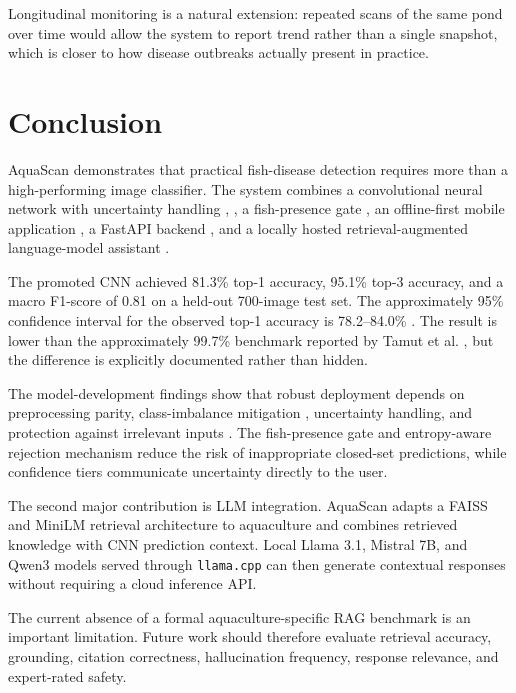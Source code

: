 \documentclass[conference]{IEEEtran}
\begin{document}
Longitudinal monitoring is a natural extension: repeated scans of the same pond over time would allow the system to report trend rather than a single snapshot, which is closer to how disease outbreaks actually present in practice.



\section{Conclusion}

AquaScan demonstrates that practical fish-disease detection requires more than a high-performing image classifier. The system combines a convolutional neural network with uncertainty handling \cite{b24}, \cite{b25}, a fish-presence gate \cite{b7}, an offline-first mobile application \cite{b14}, a FastAPI backend \cite{b15}, and a locally hosted retrieval-augmented language-model assistant \cite{b4}.

The promoted CNN achieved 81.3\% top-1 accuracy, 95.1\% top-3 accuracy, and a macro F1-score of 0.81 on a held-out 700-image test set. The approximately 95\% confidence interval for the observed top-1 accuracy is 78.2--84.0\% \cite{b17}. The result is lower than the approximately 99.7\% benchmark reported by Tamut et al. \cite{b1}, but the difference is explicitly documented rather than hidden.

The model-development findings show that robust deployment depends on preprocessing parity, class-imbalance mitigation \cite{b3}, uncertainty handling, and protection against irrelevant inputs \cite{b25}. The fish-presence gate and entropy-aware rejection mechanism \cite{b24} reduce the risk of inappropriate closed-set predictions, while confidence tiers communicate uncertainty directly to the user.

The second major contribution is LLM integration. AquaScan adapts a FAISS \cite{b6} and MiniLM \cite{b5} retrieval architecture to aquaculture and combines retrieved knowledge with CNN prediction context. Local Llama 3.1, Mistral 7B, and Qwen3 models served through \texttt{llama.cpp} \cite{b13} can then generate contextual responses without requiring a cloud inference API.

The current absence of a formal aquaculture-specific RAG benchmark is an important limitation. Future work should therefore evaluate retrieval accuracy, grounding, citation correctness, hallucination frequency, response relevance, and expert-rated safety.
\end{document}
